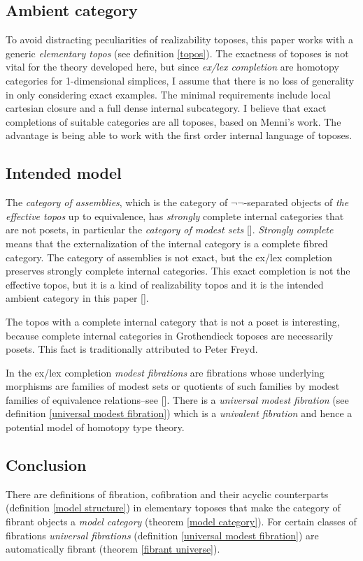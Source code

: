 \documentclass{tac}
\newcommand\citep[1]{[\cite{#1}]}
\begin{document}
\subsection*{Ambient category}
To avoid distracting peculiarities of realizability toposes, this paper works 
with a generic \emph{elementary topos} (see definition \ref{topos}). 
The exactness of toposes is not vital for the theory developed here, but 
since \emph{ex/lex completion} are homotopy categories for 1-dimensional 
simplices, I assume that there is no loss of generality in only considering 
exact examples. %
The minimal requirements include local cartesian closure and a full 
dense internal subcategory. I believe that exact completions of 
suitable categories are all toposes, based on Menni's work. %
The advantage is being able to work with the first order internal language of 
toposes.

\subsection*{Intended model} The \emph{category of assemblies}, which is the 
category of $\neg\neg$-separated objects of \emph{the effective topos} up to 
equivalence, has \emph{strongly} complete internal categories that are 
not posets, in particular the \emph{category of modest sets} \citep{MR1097022,
MR2479466,MR1023803}. \emph{Strongly complete} means that the externalization 
of the internal category is a complete fibred category. The category of 
assemblies is not exact, but the ex/lex completion 
preserves strongly complete internal categories. This exact completion is not 
the effective topos, but it is a kind of realizability topos and it is 
the intended ambient category in this paper \citep{MR1600009}. 

The topos with a complete internal category that is not a poset is interesting, 
because complete internal categories in Grothendieck toposes are necessarily 
posets. This fact is traditionally attributed to Peter Freyd.

In the ex/lex completion \emph{modest fibrations} are fibrations whose 
underlying morphisms are families of modest sets or quotients of such families 
by modest families of equivalence relations--see \citep{MR1097022,MR1023803,
MR2479466}. There is a \emph{universal modest fibration} (see definition 
\ref{universal modest fibration}) which is a \emph{univalent fibration} and 
hence a potential model of homotopy type theory.

\subsection*{Conclusion} There are definitions of fibration, cofibration and 
their acyclic counterparts (definition \ref{model structure}) in 
elementary toposes that make the category of fibrant objects a \emph{model 
category} (theorem \ref{model category}). For certain classes of fibrations 
\emph{universal fibrations} (definition \ref{universal modest fibration}) are 
automatically fibrant (theorem \ref{fibrant universe}).
\end{document}
